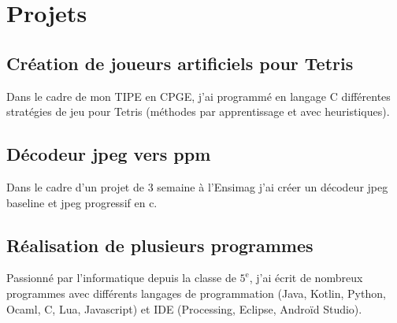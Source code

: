 \documentclass[11pt,oneside,a4paper,titlepage]{article}
\begin{document}
\vspace*{-1cm}
\section*{Projets}
\subsection*{Création de joueurs artificiels pour Tetris}
Dans le cadre de mon TIPE en CPGE, j'ai programmé en langage C différentes stratégies de jeu pour Tetris (méthodes par apprentissage et avec heuristiques).
\subsection*{Décodeur jpeg vers ppm}
Dans le cadre d'un projet de 3 semaine à l'Ensimag j'ai créer un décodeur jpeg baseline et jpeg progressif en c.
\subsection*{Réalisation de plusieurs programmes}
Passionné par l'informatique depuis la classe de $5^{\text{e}}$, j'ai écrit de nombreux programmes avec différents langages de programmation (Java, Kotlin, Python, Ocaml, C, Lua, Javascript) et IDE (Processing, Eclipse, Androïd Studio).
\end{document}
